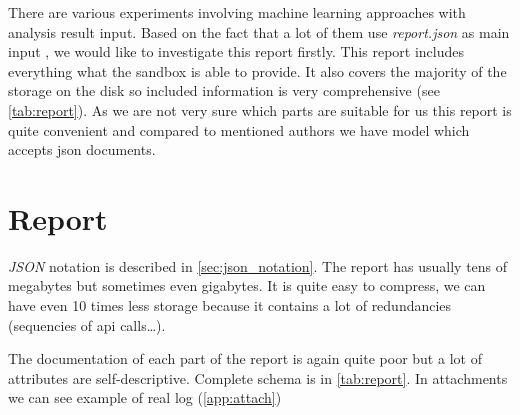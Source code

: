 There are various experiments involving machine learning approaches with analysis result input. Based on the fact that a lot of them use \emph{report.json} as main input \cite{Darshan2016, Dinh2019a, Kim2020, Sethi2019}, we would like to investigate this report firstly. This report includes everything what the sandbox is able to provide. It also covers the majority of the storage on the disk so included information is very comprehensive (see \ref{tab:report}). As we are not very sure which parts are suitable for us this report is quite convenient and compared to mentioned authors we have model which accepts json documents.


\section{Report}
\emph{JSON} notation is described in \ref{sec:json_notation}. The report has usually tens of megabytes but sometimes even gigabytes. It is quite easy to compress, we can have even 10 times less storage because it contains a lot of redundancies (sequencies of api calls\dots). 

The documentation of each part of the report is again quite poor but a lot of attributes are self-descriptive. Complete schema is in \ref{tab:report}. In attachments we can see example of real log (\ref{app:attach})

